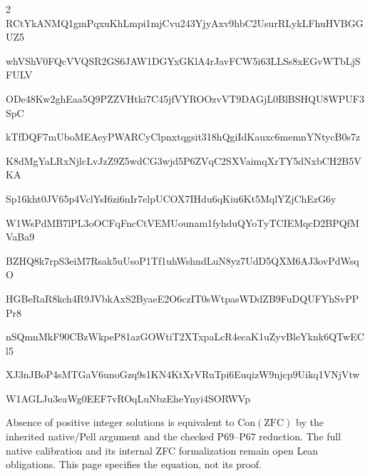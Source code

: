 \documentclass[10pt]{article}
\begin{document}
\begin{multicols}{2}
\begingroup
\fontsize{8}{9.1}\selectfont\ttfamily
RCtYkANMQ1gmPqxuKhLmpi1mjCvu243YjyAxv9hbC2UsurRLykLFhuHVBGGUZ5\par
whVShV0FQcVVQSR2GS6JAW1DGYxGKlA4rJavFCW5i63LLSs8xEGvWTbLjSFULV\par
ODe48Kw2ghEaa5Q9PZZVHtki7C45jfVYROOzvVT9DAGjL0BlBSHQU8WPUF3SpC\par
kTfDQF7mUboMEAeyPWARCyClpnxtqgsit318hQgiIdKauxc6memnYNtycB0s7z\par
K8dMgYaLRxNjlcLvJzZ9Z5wdCG3wjd5P6ZVqC2SXVaimqXrTY5dNxbCH2B5VKA\par
Sp16kht0JV65p4VclYsI6zi6nIr7elpUCOX7IHdu6qKiu6Kt5MqlYZjChEzG6y\par
W1WsPdMB7lPL3oOCFqFncCtVEMUounam1fyhduQYoTyTCIEMqcD2BPQfMVaBa9\par
BZHQ8k7rpS3eiM7Rsak5uUsoP1Tf1uhWshndLuN8yz7UdD5QXM6AJ3ovPdWsqO\par
HGBeRaR8kch4R9JVbkAxS2ByaeE2O6czIT0sWtpasWDdZB9FuDQUFYhSvPPPr8\par
nSQmnMkF90CBzWkpeP81azGOWtiT2XTxpaLcR4ecaK1uZyvBleYknk6QTwECl5\par
XJ3nJBoP4sMTGaV6unoGzq9s1KN4KtXrVRuTpi6EuqizW9njcp9Uikq1VNjVtw\par
W1AGLJu3eaWg0EEF7vROqLuNbzEheYnyi4SORWVp\par
\endgroup
\medskip
\normalfont\footnotesize
Absence of positive integer solutions is equivalent to $\mathrm{Con}(\mathrm{ZFC})$
by the inherited native/Pell argument and the checked P69--P67 reduction.
The full native calibration and its internal ZFC formalization remain open
Lean obligations. This page specifies the equation, not its proof.
\end{multicols}
\end{document}
